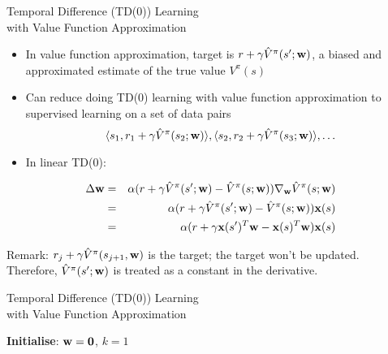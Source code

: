 \documentclass[aspectratio=169]{../latex_main/tntbeamer}  %
\begin{document}
\begin{frame}[c]{Temporal Difference (TD(0)) Learning\\ with Value Function Approximation}
	
	\begin{itemize}
		\item In value function approximation, target is $r + \gamma \hat{V}^\pi (s'; \mathbf{w})$, a biased and approximated estimate of the true value $V^\pi(s)$
		\item Can reduce doing TD(0) learning with value function approximation to supervised learning on a set of data pairs
		$$\langle  s_1, r_1+ \gamma \hat{V}^\pi (s_2; \mathbf{w}) \rangle, \langle  s_2, r_2+ \gamma \hat{V}^\pi (s_3; \mathbf{w}) \rangle, \ldots $$
		\item In linear TD(0):
	\end{itemize}
\vspace{-1em}
\begin{eqnarray}
\Delta \mathbf{w} &=& \alpha( r + \gamma \hat{V}^\pi(s'; \mathbf{w}) - \hat{V}^\pi(s;\mathbf{w})) \nabla_{\mathbf{w}} \hat{V}^\pi (s;\mathbf{w})\nonumber\\
&=& \alpha( r + \gamma \hat{V}^\pi(s'; \mathbf{w}) - \hat{V}^\pi(s;\mathbf{w})) \mathbf{x}(s)\nonumber\\
&=& \alpha( r + \gamma \mathbf{x}(s')^T \mathbf{w} - \mathbf{x}(s)^T\mathbf{w}) \mathbf{x}(s)\nonumber
\end{eqnarray}

\alert{Remark:} $r_j + \gamma \hat{V}^\pi(s_{j+1}, \mathbf{w})$ is the target; the target won't be updated.\\  Therefore, $\hat{V}^\pi(s'; \mathbf{w})$ is treated as a constant in the derivative.
\end{frame}
\begin{frame}[c]{Temporal Difference (TD(0)) Learning\\ with Value Function Approximation}

    \begin{algorithm}[H]
        \caption{TD(0) Value Function Approximation}
        \DontPrintSemicolon
        \LinesNotNumbered
        \textbf{Initialise}:  $\mathbf{w}= \mathbf{0}$, $k=1$\\
    \end{algorithm}

\end{frame}
\end{document}
